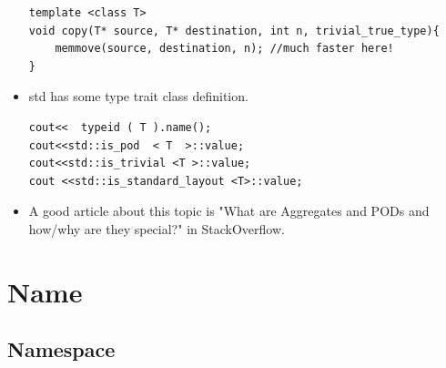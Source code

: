 \documentclass[a4paper,11pt,twoside]{book}
\begin{document}
\begin{itemize}
\begin{lstlisting}[numbers=none]
template <class T> 
void copy(T* source, T* destination, int n, trivial_true_type){
	memmove(source, destination, n); //much faster here!
}
\end{lstlisting}
	
	
\item std has some type trait class definition. 
\begin{lstlisting}[numbers=none]
cout<<  typeid ( T ).name();
cout<<std::is_pod  < T  >::value;
cout<<std::is_trivial <T >::value;
cout <<std::is_standard_layout <T>::value;
\end{lstlisting}
	
\item A good article about this topic is "What are Aggregates and PODs and how/why are they special?" in StackOverflow. 
\end{itemize}


\section{Name}
\subsection{Namespace}
\end{document}
